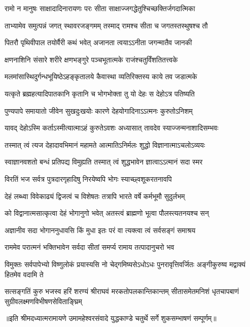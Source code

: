 


\addtocounter{shlokacount}{39}


\twolineshloka
{रामो न मानुषः साक्षादादिनारायणः परः}
{सीता साक्षाज्जगद्धेतुश्चिच्छक्तिर्जगदात्मिका} %

\twolineshloka
{ताभ्यामेव समुत्पन्नं जगत् स्थावरजङ्गमम्}
{तस्माद् रामश्च सीता च जगतस्तस्थुषश्च तौ} %

\twolineshloka
{पितरौ पृथिवीपाल तयोर्वैरी कथं भवेत्}
{अजानता त्वयाऽऽनीता जगन्मातैव जानकी} %

\twolineshloka
{क्षणनाशिनि संसारे शरीरे क्षणभङ्गुरे}
{पञ्चभूतात्मके राजंश्चतुर्विंशतितत्त्वके} %

\twolineshloka
{मलमांसास्थिदुर्गन्धभूयिष्ठेऽहङ्कृतालये}
{कैवास्था व्यतिरिक्तस्य काये तव जडात्मके} %

\twolineshloka
{यत्कृते ब्रह्महत्यादिपातकानि कृतानि च}
{भोगभोक्ता तु यो देहः स देहोऽत्र पतिष्यति} %

\twolineshloka
{पुण्यपापे समायातो जीवेन सुखदुःखयोः}
{कारणे देहयोगादिनाऽऽत्मनः कुरुतोऽनिशम्} %

\twolineshloka
{यावद् देहोऽस्मि कर्ताऽस्मीत्यात्माऽहं कुरुतेऽवशः}
{अध्यासात् तावदेव स्याज्जन्मनाशादिसम्भवः} %

\twolineshloka
{तस्मात् त्वं त्यज देहादावभिमानं महामते}
{आत्मातिऽनिर्मलः शुद्धो विज्ञानात्माऽचलोऽव्ययः} %

\twolineshloka
{स्वाज्ञानवशतो बन्धं प्रतिपद्य विमुह्यति}
{तस्मात् त्वं शुद्धभावेन ज्ञात्वाऽऽत्मानं सदा स्मर} %

\twolineshloka
{विरतिं भज सर्वत्र पुत्रदारगृहादिषु}
{निरयेष्वपि भोगः स्याच्छ्वशूकरतनावपि} %

\twolineshloka
{देहं लब्ध्वा विवेकाढ्यं द्विजत्वं च विशेषतः}
{तत्रापि भारते वर्षे कर्मभूमौ सुदुर्लभम्} %

\twolineshloka
{को विद्वानात्मसात्कृत्वा देहं भोगानुगो भवेत्}
{अतस्त्वं ब्राह्मणो भूत्वा पौलस्त्यतनयश्च सन्} %

\twolineshloka
{अज्ञानीव सदा भोगाननुधावसि किं मुधा}
{इतः परं वा त्यक्त्वा त्वं सर्वसङ्गं समाश्रय} %

\twolineshloka
{राममेव परात्मनं भक्तिभावेन सर्वदा}
{सीतां समर्प्य रामाय तत्पादानुचरो भव} %

\threelineshloka
{विमुक्तः सर्वपापेभ्यो विष्णुलोकं प्रयास्यसि}
{नो चेद्गमिष्यसेऽधोऽधः पुनरावृत्तिवर्जितः}
{अङ्गीकुरुष्व मद्वाक्यं हितमेव वदामि ते} %

\fourlineindentedshloka
{सत्सङ्गतिं कुरु भजस्व हरिं शरण्यं}
{श्रीराघवं मरकतोपलकान्तिकान्तम्}
{सीतासमेतमनिशं धृतचापबाणं}
{सुग्रीवलक्ष्मणविभीषणसेविताङ्घ्रिम्} %

{॥इति श्रीमदध्यात्मरामायणे उमामहेश्वरसंवादे युद्धकाण्डे
चतुर्थे सर्गे शुकसम्भाषणं  सम्पूर्णम्॥}
